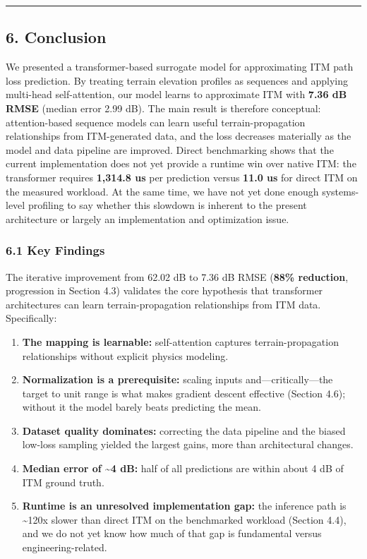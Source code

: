 \documentclass[
]{article}
\providecommand{\tightlist}{%
  \setlength{\itemsep}{0pt}\setlength{\parskip}{0pt}}
\begin{document}
\begin{center}\rule{0.5\linewidth}{0.5pt}\end{center}

\subsection{6. Conclusion}\label{conclusion}

We presented a transformer-based surrogate model for approximating ITM
path loss prediction. By treating terrain elevation profiles as
sequences and applying multi-head self-attention, our model learns to
approximate ITM with \textbf{7.36 dB RMSE} (median error 2.99 dB). The
main result is therefore conceptual: attention-based sequence models can
learn useful terrain-propagation relationships from ITM-generated data,
and the loss decreases materially as the model and data pipeline are
improved. Direct benchmarking shows that the current implementation does
not yet provide a runtime win over native ITM: the transformer requires
\textbf{1,314.8 us} per prediction versus \textbf{11.0 us} for direct
ITM on the measured workload. At the same time, we have not yet done
enough systems-level profiling to say whether this slowdown is inherent
to the present architecture or largely an implementation and
optimization issue.

\subsubsection{6.1 Key Findings}\label{key-findings}

The iterative improvement from 62.02 dB to 7.36 dB RMSE (\textbf{88\%
reduction}, progression in Section 4.3) validates the core hypothesis
that transformer architectures can learn terrain-propagation
relationships from ITM data. Specifically:

\begin{enumerate}
\def\labelenumi{\arabic{enumi}.}
\tightlist
\item
  \textbf{The mapping is learnable:} self-attention captures
  terrain-propagation relationships without explicit physics modeling.
\item
  \textbf{Normalization is a prerequisite:} scaling inputs
  and---critically---the target to unit range is what makes gradient
  descent effective (Section 4.6); without it the model barely beats
  predicting the mean.
\item
  \textbf{Dataset quality dominates:} correcting the data pipeline and
  the biased low-loss sampling yielded the largest gains, more than
  architectural changes.
\item
  \textbf{Median error of \textasciitilde4 dB:} half of all predictions
  are within about 4 dB of ITM ground truth.
\item
  \textbf{Runtime is an unresolved implementation gap:} the inference
  path is \textasciitilde120x slower than direct ITM on the benchmarked
  workload (Section 4.4), and we do not yet know how much of that gap is
  fundamental versus engineering-related.
\end{enumerate}
\end{document}
